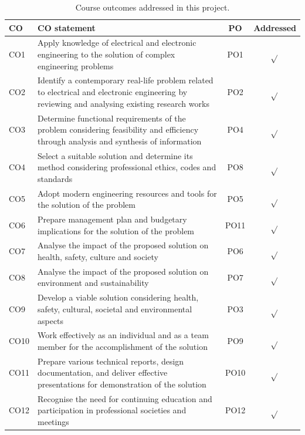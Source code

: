 \begin{table}[htbp]
\centering
\caption{Course outcomes addressed in this project.}
\label{tab:6_1}
\vspace{0.4em}
\singlespacing
\small
\begin{tabularx}{\linewidth}{l X c c}
\toprule
\textbf{CO} & \textbf{CO statement} & \textbf{PO} & \textbf{Addressed} \\
\midrule
CO1 & Apply knowledge of electrical and electronic engineering to the solution of complex engineering problems & PO1 & $\sqrt{}$ \\
CO2 & Identify a contemporary real-life problem related to electrical and electronic engineering by reviewing and analysing existing research works & PO2 & $\sqrt{}$ \\
CO3 & Determine functional requirements of the problem considering feasibility and efficiency through analysis and synthesis of information & PO4 & $\sqrt{}$ \\
CO4 & Select a suitable solution and determine its method considering professional ethics, codes and standards & PO8 & $\sqrt{}$ \\
CO5 & Adopt modern engineering resources and tools for the solution of the problem & PO5 & $\sqrt{}$ \\
CO6 & Prepare management plan and budgetary implications for the solution of the problem & PO11 & $\sqrt{}$ \\
CO7 & Analyse the impact of the proposed solution on health, safety, culture and society & PO6 & $\sqrt{}$ \\
CO8 & Analyse the impact of the proposed solution on environment and sustainability & PO7 & $\sqrt{}$ \\
CO9 & Develop a viable solution considering health, safety, cultural, societal and environmental aspects & PO3 & $\sqrt{}$ \\
CO10 & Work effectively as an individual and as a team member for the accomplishment of the solution & PO9 & $\sqrt{}$ \\
CO11 & Prepare various technical reports, design documentation, and deliver effective presentations for demonstration of the solution & PO10 & $\sqrt{}$ \\
CO12 & Recognise the need for continuing education and participation in professional societies and meetings & PO12 & $\sqrt{}$ \\
\bottomrule
\end{tabularx}
\end{table}


